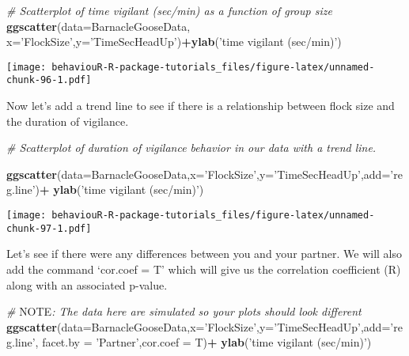 \documentclass[]{book}
\newenvironment{Shaded}{\begin{snugshade}}{\end{snugshade}}
\newcommand{\AlertTok}[1]{\textcolor[rgb]{0.94,0.16,0.16}{#1}}
\newcommand{\CommentTok}[1]{\textcolor[rgb]{0.56,0.35,0.01}{\textit{#1}}}
\newcommand{\DataTypeTok}[1]{\textcolor[rgb]{0.13,0.29,0.53}{#1}}
\newcommand{\KeywordTok}[1]{\textcolor[rgb]{0.13,0.29,0.53}{\textbf{#1}}}
\newcommand{\NormalTok}[1]{#1}
\newcommand{\OperatorTok}[1]{\textcolor[rgb]{0.81,0.36,0.00}{\textbf{#1}}}
\newcommand{\StringTok}[1]{\textcolor[rgb]{0.31,0.60,0.02}{#1}}
\begin{document}
\begin{Shaded}
\begin{Highlighting}[]
\CommentTok{# Scatterplot of time vigilant (sec/min) as a function of group size}
\KeywordTok{ggscatter}\NormalTok{(}\DataTypeTok{data=}\NormalTok{BarnacleGooseData,}
          \DataTypeTok{x=}\StringTok{'FlockSize'}\NormalTok{,}\DataTypeTok{y=}\StringTok{'TimeSecHeadUp'}\NormalTok{)}\OperatorTok{+}\KeywordTok{ylab}\NormalTok{(}\StringTok{'time vigilant (sec/min)'}\NormalTok{)}
\end{Highlighting}
\end{Shaded}

\texttt{[image: behaviouR-R-package-tutorials\_files/figure-latex/unnamed-chunk-96-1.pdf]}

Now let's add a trend line to see if there is a relationship between flock size and the duration of vigilance.

\begin{Shaded}
\begin{Highlighting}[]
\CommentTok{# Scatterplot of duration of vigilance behavior in our data with a trend line.}

\KeywordTok{ggscatter}\NormalTok{(}\DataTypeTok{data=}\NormalTok{BarnacleGooseData,}\DataTypeTok{x=}\StringTok{'FlockSize'}\NormalTok{,}\DataTypeTok{y=}\StringTok{'TimeSecHeadUp'}\NormalTok{,}\DataTypeTok{add=}\StringTok{'reg.line'}\NormalTok{)}\OperatorTok{+}
\StringTok{  }\KeywordTok{ylab}\NormalTok{(}\StringTok{'time vigilant (sec/min)'}\NormalTok{)}
\end{Highlighting}
\end{Shaded}

\texttt{[image: behaviouR-R-package-tutorials\_files/figure-latex/unnamed-chunk-97-1.pdf]}

Let's see if there were any differences between you and your partner. We will also add the command `cor.coef = T' which will give us the correlation coefficient (R) along with an associated p-value.

\begin{Shaded}
\begin{Highlighting}[]
\CommentTok{# }\AlertTok{NOTE}\CommentTok{: The data here are simulated so your plots should look different}
\KeywordTok{ggscatter}\NormalTok{(}\DataTypeTok{data=}\NormalTok{BarnacleGooseData,}\DataTypeTok{x=}\StringTok{'FlockSize'}\NormalTok{,}\DataTypeTok{y=}\StringTok{'TimeSecHeadUp'}\NormalTok{,}\DataTypeTok{add=}\StringTok{'reg.line'}\NormalTok{,}
          \DataTypeTok{facet.by =} \StringTok{'Partner'}\NormalTok{,}\DataTypeTok{cor.coef =}\NormalTok{ T)}\OperatorTok{+}
\StringTok{  }\KeywordTok{ylab}\NormalTok{(}\StringTok{'time vigilant (sec/min)'}\NormalTok{)}
\end{Highlighting}
\end{Shaded}
\end{document}
